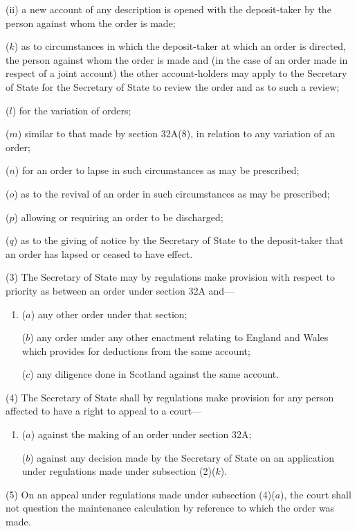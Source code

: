 \documentclass[12pt,a4paper]{article}
\begin{document}
\begin{enumerate}
\begin{enumerate}
(ii) a new account of any description is opened with the deposit-taker by
the person against whom the order is made;
\end{enumerate}

($k$) as to circumstances in which the deposit-taker at which an order is directed,
the person against whom the order is made and (in the case of an order made
in respect of a joint account) the other account-holders may apply to the
Secretary of State for the Secretary of State to review the order and as to
such a review;

($l$) for the variation of orders;

($m$) similar to that made by section 32A(8), in relation to any variation of an
order;

($n$) for an order to lapse in such circumstances as may be prescribed;

($o$) as to the revival of an order in such circumstances as may be prescribed;

($p$) allowing or requiring an order to be discharged;

($q$) as to the giving of notice by the Secretary of State to the deposit-taker that an
order has lapsed or ceased to have effect.
\end{enumerate}

(3)
The Secretary of State may by regulations make provision with respect to priority as between an order under section 32A and---
\begin{enumerate}\item[]
($a$) any other order under that section;

($b$) any order under any other enactment relating to England and Wales which
provides for deductions from the same account;

($c$) any diligence done in Scotland against the same account.
\end{enumerate}

(4)
The Secretary of State shall by regulations make provision for any person affected to have a right to appeal to a court---
\begin{enumerate}\item[]
($a$) against the making of an order under section 32A;

($b$) against any decision made by the Secretary of State on an application
under regulations made under subsection (2)($k$).
\end{enumerate}

(5)
On an appeal under regulations made under subsection (4)($a$), the court shall not question the maintenance calculation by reference to which the order was made.
\end{document}
